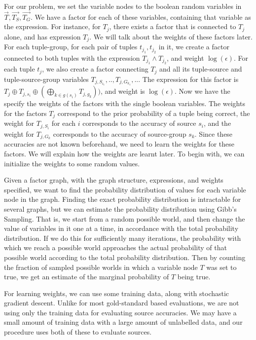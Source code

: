 \documentclass{sig-alternate}
\newcounter{prob}
\begin{document}
For our problem, we set the variable nodes to the boolean random variables in $\overrightarrow{T}, \overrightarrow{T_S}, \overrightarrow{T_G}$. We have a factor for each of these variables, containing that variable as the expression. For instance, for $T_j$, there exists a factor that is connected to $T_j$ alone, and has expression $T_j$. We will talk about the weights of these factors later. For each tuple-group, for each pair of tuples $t_{j_1}, t_{j_2}$ in it, we create a factor connected to both tuples with the expression $T_{j_1} \land T_{j_2}$, and weight $\log(\epsilon)$. For each tuple $t_j$, we also create a factor connecting $T_j$ and all its tuple-source and tuple-source-group variables $T_{j, S_{i_1}}, .., T_{j, G_{k_1}}, ..$. The expression for this factor is $T_j \oplus T_{j, s_i} \oplus(\bigoplus_{k\in g(s_i)} T_{j, g_k}))$, and weight is $\log(\epsilon)$. Now we have the specify the weights of the factors with the single boolean variables. The weights for the factors $T_j$ correspond to the prior probability of a tuple being correct, the weight for $T_{j, S_i}$ for each $i$ corresponds to the accuracy of source $s_i$, and the weight for $T_{j, G_k}$ corresponds to the accuracy of source-group $s_k$. Since these accuracies are not known beforehand, we need to learn the weights for these factors. We will explain how the weights are learnt later. To begin with, we can initialize the weights to some random values. 

Given a factor graph, with the graph structure, expressions, and weights specified, we want to find the probability distribution of values for each variable node in the graph. Finding the exact probability distribution is intractable for several graphs, but we can estimate the probability distribution using Gibb's Sampling. That is, we start from a random possible world, and then change the value of variables in it one at a time, in accordance with the total probability distribution. If we do this for sufficiently many iterations, the probability with which we reach a possible world approaches the actual probability of that possible world according to the total probability distribution. Then by counting the fraction of sampled possible worlds in which a variable node $T$ was set to true, we get an estimate of the marginal probability of $T$ being true. 

For learning weights, we can use some training data, along with stochastic gradient descent. Unlike for most gold-standard based evaluations, we are not using only the training data for evaluating source accuracies. We may have a small amount of training data with a large amount of unlabelled data, and our procedure uses both of these to evaluate sources. 

\begin{comment}
Later:
Crowdsourcing with budget
Key constraints (part of tuple correlations?)
partial extraction
partial correctness.
\end{comment}

{\small

  
}
\end{document}
